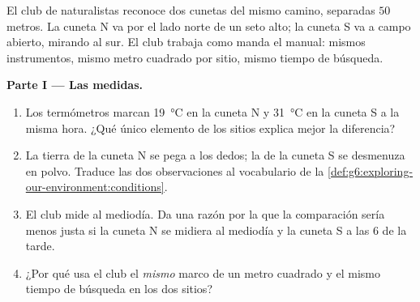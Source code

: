 \begin{problem}\label{pb:g6:exploring-our-environment:1}
El club de naturalistas reconoce dos cunetas del mismo camino,
separadas $50$ metros. La cuneta N va por el lado norte de un seto
alto; la cuneta S va a campo abierto, mirando al sur. El club trabaja
como manda el manual: mismos instrumentos, mismo metro cuadrado por
sitio, mismo tiempo de búsqueda.

\medskip\noindent\textbf{Parte I --- Las medidas.}
\begin{enumerate}
  \item Los termómetros marcan \qty{19}{\degreeCelsius} en la cuneta N
        y \qty{31}{\degreeCelsius} en la cuneta S a la misma hora.
        ¿Qué único elemento de los sitios explica mejor la diferencia?
  \item La tierra de la cuneta N se pega a los dedos; la de la cuneta
        S se desmenuza en polvo. Traduce las dos observaciones al
        vocabulario de la
        \cref{def:g6:exploring-our-environment:conditions}.
  \item El club mide al mediodía. Da una razón por la que la
        comparación sería menos justa si la cuneta N se midiera al
        mediodía y la cuneta S a las 6 de la tarde.
  \item ¿Por qué usa el club el \emph{mismo} marco de un metro
        cuadrado y el mismo tiempo de búsqueda en los dos sitios?
\end{enumerate}


\end{problem}
